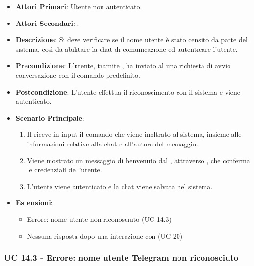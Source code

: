 	\begin{itemize}
		\item \textbf{Attori Primari}: Utente non autenticato.
		\item \textbf{Attori Secondari}: .
		\item \textbf{Descrizione}: Si deve verificare se il nome utente è stato censito da parte del sistema, così da abilitare la chat di comunicazione ed autenticare l'utente.
		\item \textbf{Precondizione}: L'utente, tramite , ha inviato al  una richiesta di avvio conversazione con il comando predefinito.
		\item \textbf{Postcondizione}: L'utente effettua il riconoscimento con il sistema e viene autenticato.
		\item \textbf{Scenario Principale}:
		\begin{enumerate}
			\item Il   riceve in input il comando che viene inoltrato al sistema, insieme alle informazioni relative alla chat e all'autore del messaggio.
			\item Viene mostrato un messaggio di benvenuto dal , attraverso , che conferma le credenziali dell'utente.
			\item L'utente viene autenticato e la chat viene salvata nel sistema.
		\end{enumerate}
		\item \textbf{Estensioni}:
		\begin{itemize}
			\item Errore: nome utente  non riconosciuto (UC 14.3)
			\item Nessuna risposta dopo una interazione con  (UC 20)
		\end{itemize}
	\end{itemize}

	\subsubsection{UC 14.3 - Errore: nome utente Telegram non riconosciuto}

